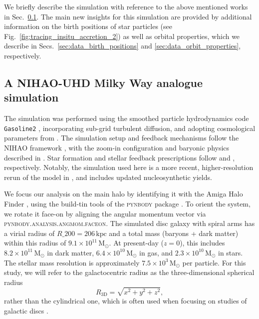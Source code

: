 \documentclass[fleqn,usenatbib]{mnras}
\newcommand{\changed}[1]{{{#1}}}
\begin{document}
We briefly describe the simulation with reference to the above mentioned works in Sec.~\ref{sec:data_simulation}. The main new insights for this simulation are provided by additional information on the birth positions of star particles (see Fig.~\ref{fig:tracing_insitu_accretion_2}) as well as orbit\changed{al} properties, which we describe in Secs.~\ref{sec:data_birth_positions} and \ref{sec:data_orbit_properties}, respectively.

\subsection{A NIHAO-UHD Milky Way analogue simulation} \label{sec:data_simulation}

The simulation was performed using the smoothed particle hydrodynamics code \texttt{Gasoline2} \citep{Wadsley2017}, incorporating sub-grid turbulent diffusion, and adopting cosmological parameters from \citet{Planck2014}. The simulation setup and feedback mechanisms follow the NIHAO framework \citep{Wang2015}, with the zoom-in configuration and baryonic physics described in \citet{Buck2021}. Star formation and stellar feedback prescriptions follow \citet{Stinson2006} and \citet{Stinson2013}, respectively. Notably, the simulation used here is a more recent, higher-resolution rerun of the model in \citet{Buder2024}, and includes updated nucleosynthetic yields.

We focus our analysis on the main halo by identifying it with the Amiga Halo Finder \citep{Knollman2009}, using the build-tin tools of the \textsc{pynbody} package \citep{pynbody}. To orient the system, we rotate it face-on by aligning the angular momentum vector via \textsc{pynbody.analysis.angmom.faceon}. The simulated disc galaxy with spiral arms has a virial radius of $R\_{200} = 206\,\mathrm{kpc}$ and a total mass (baryons + dark matter) within this radius of $9.1 \times 10^{11}\,\mathrm{M_\odot}$. At present-day ($z = 0$), this includes $8.2 \times 10^{11}\,\mathrm{M_\odot}$ in dark matter, $6.4 \times 10^{10}\,\mathrm{M_\odot}$ in gas, and $2.3 \times 10^{10}\,\mathrm{M_\odot}$ in stars. The stellar mass resolution is approximately $7.5 \times 10^3\,\mathrm{M_{\odot}}$ per particle. For this study, we will refer to the galactocentric radius as the three-dimensional spherical radius
\begin{equation}
    R_{\mathrm{3D}} = \sqrt{x^2 + y^2 + z^2},
\end{equation}
rather than the cylindrical one, which is often used when focusing on studies of galactic discs \citep[for example by][for the same simulation]{Buder2025}.
\end{document}
